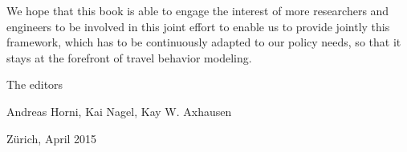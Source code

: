 We hope that this book is able to engage the interest of more researchers and engineers to be involved in this joint effort to enable us to provide jointly this \gls{framework}, which has to be continuously adapted to our policy needs, so that it stays at the forefront of travel behavior modeling.

The editors

Andreas Horni, 	Kai Nagel,	Kay W. Axhausen


Zürich, April 2015

